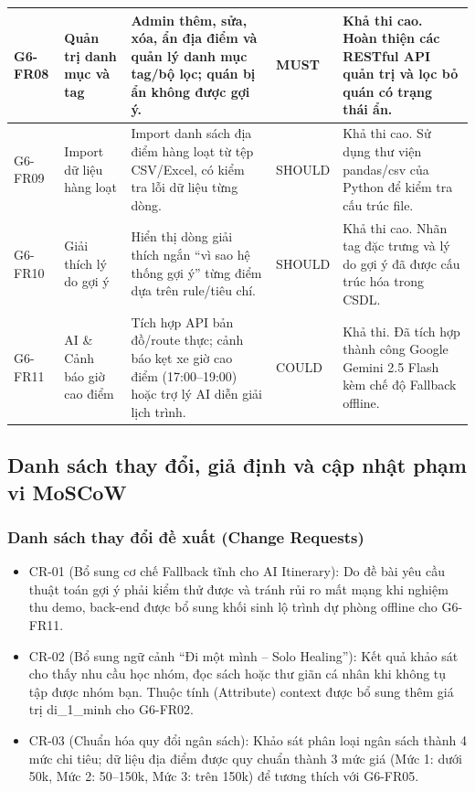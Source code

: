 \documentclass[13pt,a4paper]{extreport}
\begin{document}
\begin{longtable}{|L{1.3cm}|L{2.3cm}|L{4.7cm}|L{1.8cm}|L{4.3cm}|}
\hline
G6-FR08 & Quản trị danh mục và tag & Admin thêm, sửa, xóa, ẩn địa điểm và quản lý danh mục tag/bộ lọc; quán bị ẩn không được gợi ý. & MUST & Khả thi cao. Hoàn thiện các RESTful API quản trị và lọc bỏ quán có trạng thái ẩn. \\
\hline
G6-FR09 & Import dữ liệu hàng loạt & Import danh sách địa điểm hàng loạt từ tệp CSV/Excel, có kiểm tra lỗi dữ liệu từng dòng. & SHOULD & Khả thi cao. Sử dụng thư viện pandas/csv của Python để kiểm tra cấu trúc file. \\
\hline
G6-FR10 & Giải thích lý do gợi ý & Hiển thị dòng giải thích ngắn ``vì sao hệ thống gợi ý'' từng điểm dựa trên rule/tiêu chí. & SHOULD & Khả thi cao. Nhãn tag đặc trưng và lý do gợi ý đã được cấu trúc hóa trong CSDL. \\
\hline
G6-FR11 & AI \& Cảnh báo giờ cao điểm & Tích hợp API bản đồ/route thực; cảnh báo kẹt xe giờ cao điểm (17:00--19:00) hoặc trợ lý AI diễn giải lịch trình. & COULD & Khả thi. Đã tích hợp thành công Google Gemini 2.5 Flash kèm chế độ Fallback offline. \\
\end{longtable}

\subsection{Danh sách thay đổi, giả định và cập nhật phạm vi MoSCoW}

\subsubsection{Danh sách thay đổi đề xuất (Change Requests)}
\begin{itemize}
    \item CR-01 (Bổ sung cơ chế Fallback tĩnh cho AI Itinerary): Do đề bài yêu cầu thuật toán gợi ý phải kiểm thử được và tránh rủi ro mất mạng khi nghiệm thu demo, back-end được bổ sung khối sinh lộ trình dự phòng offline cho G6-FR11.
    \item CR-02 (Bổ sung ngữ cảnh ``Đi một mình -- Solo Healing''): Kết quả khảo sát cho thấy nhu cầu học nhóm, đọc sách hoặc thư giãn cá nhân khi không tụ tập được nhóm bạn. Thuộc tính (Attribute) context được bổ sung thêm giá trị di\_1\_minh cho G6-FR02.
    \item CR-03 (Chuẩn hóa quy đổi ngân sách): Khảo sát phân loại ngân sách thành 4 mức chi tiêu; dữ liệu địa điểm được quy chuẩn thành 3 mức giá (Mức 1: dưới 50k, Mức 2: 50--150k, Mức 3: trên 150k) để tương thích với G6-FR05.
\end{itemize}
\end{document}
